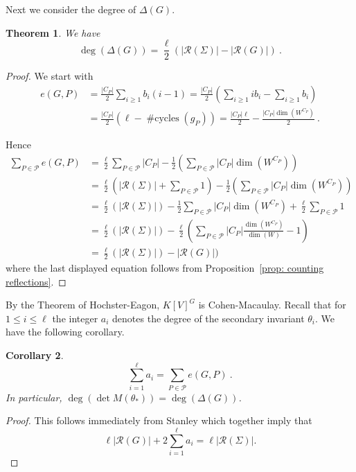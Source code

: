 \documentclass[12pt]{amsart}
\renewcommand{\geq}{\geqslant}
\renewcommand{\leq}{\leqslant}
\newcommand{\KK}{K}
\newtheorem{thm}{Theorem}[section]
\newtheorem{cor}[thm]{Corollary}
\theoremstyle{definition}
\newcommand{\calp}{\mathcal{P}}
\newcommand{\calr}{\mathcal{R}}
\newcommand{\no}{\operatorname{\#cycles}}
\newcommand{\Qi}{{\KK}}%
\newcommand{\bth}{{{\theta_*}}} %
\begin{document}
 Next we consider the degree of $\Delta(G)$.
\begin{thm}
We have
    $$
        \deg(\Delta(G)) = \frac{\ell}{2}(|\calr(\Sigma)| - |\calr(G)|)\ .
    $$
\end{thm}
\begin{proof}



We start with
    \begin{align*}
        e(G,P) &=  \frac{|C_P|}{2}\sum_{i\geq 1} b_i(i-1) 
                    = \frac{|C_P|}{2} (\sum_{i \geq 1} i b_i - \sum_{i \geq 1} b_i) \\
            &= \frac{|C_P|}{2} (\ell - \no(g_P))
            = \frac{|C_P| \ell }{2} - \frac{|C_P| \dim(W^{C_P})}{2}\ .
    \end{align*}

Hence
  \begin{align*}
      \sum_{P\in\calp}e(G,P) &= \frac{\ell}{2}\sum_{P\in\calp}|C_P| - \frac{1}{2}(\sum_{P\in\calp}|C_P|\dim(W^{C_P})) \\
        &= \frac{\ell}{2}(|\calr(\Sigma)| + \sum_{P\in\calp} 1) -\frac{1}{2}(\sum_{P\in\calp}|C_P|\dim(W^{C_P})) \\
        &= \frac{\ell}{2}(|\calr(\Sigma)|) - \frac{1}{2}\sum_{P\in\calp}|C_P|\dim(W^{C_P}) + \frac{\ell}{2} \sum_{P\in\calp} 1 \\
        & = \frac{\ell}{2}(|\calr(\Sigma)|) - \frac{\ell}{2}(\sum_{P\in\calp}|C_P|\frac{\dim(W^{C_P})}{\dim(W)} - 1) \\
        &= \frac{\ell}{2}(|\calr(\Sigma)|) - |\calr(G)|)
    \end{align*}
where the last displayed equation follows from Proposition~\ref{prop: counting reflections}.
\end{proof}



By the Theorem of Hochster-Eagon, $\Qi[V]^G$ is Cohen-Macaulay.  
Recall that for $1 \leq i \leq \ell$ the integer $a_i$ denotes the degree of the secondary invariant $\theta_i$.
We have the following corollary.
\begin{cor}
    $$
        \sum_{i=1}^{\ell} a_i = \sum_{P \in \calp} e(G,P)\ .
    $$
    In particular, $\deg (\det M(\bth)) = \deg (\Delta(G))$.
\end{cor}
\begin{proof}
This follows immediately from Stanley \cite[Corollary 4.3 and Corollary 4.4]{bible} which together imply that
    $$
        \ell |\calr(G)| +  2\sum_{i=1}^{\ell} a_i = \ell |\calr(\Sigma)|.
    $$
\end{proof}
\end{document}
